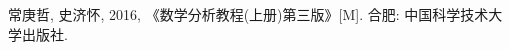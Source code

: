 \begin{thebibliography}{99}

常庚哲, 史济怀, 2016, 《数学分析教程(上册)第三版》[M]. 合肥: 中国科学技术大学出版社. 
\end{thebibliography}
